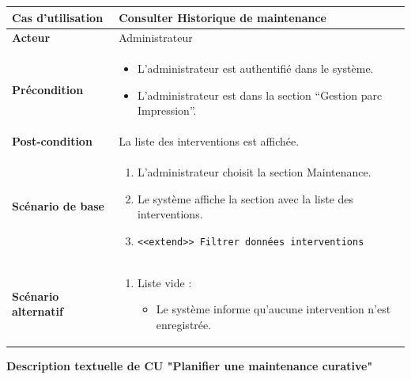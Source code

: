 \documentclass[a4paper,11pt]{report}
\begin{document}
\begin{tabularx}{\textwidth}{|>{\bfseries}l|X|}
  \hline
  Cas d’utilisation    & Consulter Historique de maintenance \\ \hline
  Acteur               & Administrateur \\ \hline
  Précondition         &
    \begin{itemize}[left=0pt]
      \item L’administrateur est authentifié dans le système.
      \item L’administrateur est dans la section ``Gestion parc Impression''.
    \end{itemize} \\ \hline
  Post-condition       & La liste des interventions est affichée. \\ \hline
  Scénario de base     &
    \begin{enumerate}[left=0pt]
      \item L’administrateur choisit la section Maintenance.
      \item Le système affiche la section avec la liste des interventions.
      \item \texttt{<<extend>> Filtrer données interventions}
    \end{enumerate} \\ \hline
  Scénario alternatif   &
    \begin{enumerate}[label=\arabic*.a,wide=0pt]
      \item[2.a] Liste vide :
        \begin{itemize}[left=1em]
          \item Le système informe qu’aucune intervention n’est enregistrée.
        \end{itemize}
    \end{enumerate} \\ \hline
\end{tabularx}
\endgroup

\newpage
\textbf{Description textuelle de CU "Planifier une maintenance curative"}
\end{document}
